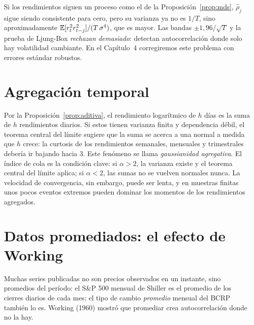 \begin{observacion}
Si los rendimientos siguen un proceso como el de la Proposición~\ref{prop:mds}, $\hat\rho_j$ sigue
siendo consistente para cero, pero su varianza ya no es $1/T$, sino aproximadamente
$\mathbb{E}[r_t^2r_{t-j}^2]/(T\,\sigma^4)$, que es mayor. Las bandas $\pm1{,}96/\sqrt T$ y la prueba de
Ljung-Box \emph{rechazan demasiado}: detectan autocorrelación donde solo hay volatilidad cambiante. En el
Capítulo~4 corregiremos este problema con errores estándar robustos.
\end{observacion}

\section{Agregación temporal}

Por la Proposición~\ref{prop:aditiva}, el rendimiento logarítmico de $h$ días es la suma de $h$
rendimientos diarios. Si estos tienen varianza finita y dependencia débil, el teorema central del límite
sugiere que la suma se acerca a una normal a medida que $h$ crece: la curtosis de los rendimientos
semanales, mensuales y trimestrales debería ir bajando hacia 3. Este fenómeno se llama
\emph{gaussianidad agregativa}. El índice de cola es la condición clave: si $\alpha>2$, la varianza
existe y el teorema central del límite aplica; si $\alpha<2$, las sumas no se vuelven normales nunca.
La velocidad de convergencia, sin embargo, puede ser lenta, y en muestras finitas unos pocos eventos
extremos pueden dominar los momentos de los rendimientos agregados.

\section{Datos promediados: el efecto de Working}\label{sec:working}

Muchas series publicadas no son precios observados en un instante, sino promedios del período: el
S\&P 500 mensual de Shiller es el promedio de los cierres diarios de cada mes; el tipo de cambio
\emph{promedio} mensual del BCRP también lo es. Working (1960) mostró que promediar crea autocorrelación
donde no la hay.

